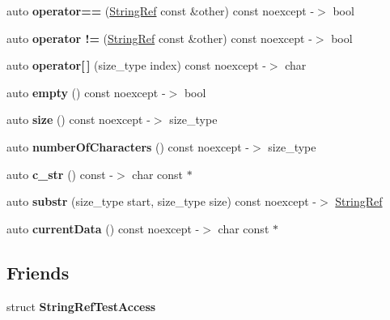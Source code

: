 \begin{DoxyCompactItemize}
auto {\bfseries operator==} (\mbox{\hyperlink{classCatch_1_1StringRef}{String\+Ref}} const \&other) const noexcept -\/$>$ bool
\item 
\mbox{\label{classCatch_1_1StringRef_afbd4abd62af0fc1a35697cbb91415fc6}} 
auto {\bfseries operator !=} (\mbox{\hyperlink{classCatch_1_1StringRef}{String\+Ref}} const \&other) const noexcept -\/$>$ bool
\item 
\mbox{\label{classCatch_1_1StringRef_a4ba2e01eec1f0f56c257d213c796ab3b}} 
auto {\bfseries operator\mbox{[}$\,$\mbox{]}} (size\+\_\+type index) const noexcept -\/$>$ char
\item 
\mbox{\label{classCatch_1_1StringRef_ac6b68b9dc1e1dec69e884e3f7be581bd}} 
auto {\bfseries empty} () const noexcept -\/$>$ bool
\item 
\mbox{\label{classCatch_1_1StringRef_ae084d72cb2952cee61a63ef36611d0ad}} 
auto {\bfseries size} () const noexcept -\/$>$ size\+\_\+type
\item 
\mbox{\label{classCatch_1_1StringRef_a6a6cac7430e626ffdd7550a081e8168f}} 
auto {\bfseries number\+Of\+Characters} () const noexcept -\/$>$ size\+\_\+type
\item 
\mbox{\label{classCatch_1_1StringRef_a1669cb2765e820ca258159676cbd82a5}} 
auto {\bfseries c\+\_\+str} () const -\/$>$ char const $\ast$
\item 
\mbox{\label{classCatch_1_1StringRef_a248568b467cf6599320903ae613c8eee}} 
auto {\bfseries substr} (size\+\_\+type start, size\+\_\+type size) const noexcept -\/$>$ \mbox{\hyperlink{classCatch_1_1StringRef}{String\+Ref}}
\item 
\mbox{\label{classCatch_1_1StringRef_aee240387305ca8b249169d79f36e7002}} 
auto {\bfseries current\+Data} () const noexcept -\/$>$ char const $\ast$
\end{DoxyCompactItemize}
\subsection*{Friends}
\begin{DoxyCompactItemize}
\item 
\mbox{\label{classCatch_1_1StringRef_a420e64e1652de1b0d427775781b018f5}} 
struct {\bfseries String\+Ref\+Test\+Access}
\end{DoxyCompactItemize}


